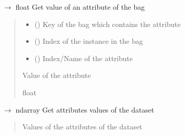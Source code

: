 \documentclass[letterpaper,10pt,english]{sphinxmanual}
\begin{document}
\begin{fulllineitems}
\begin{fulllineitems}
\label{\detokenize{data/_autosummary/miml.data.miml_dataset.MIMLDataset:miml.data.miml_dataset.MIMLDataset.get_attribute}}
\pysigstartsignatures
\pysiglinewithargsret
{}
{\sphinxparamcomma {}\sphinxparamcomma {}}
{{ $\rightarrow$ float}}
\pysigstopsignatures
\sphinxAtStartPar
Get value of an attribute of the bag
\begin{quote}\begin{description}
\begin{itemize}
\item {} 
\sphinxAtStartPar
{} () \textendash{} Key of the bag which contains the attribute

\item {} 
\sphinxAtStartPar
{} () \textendash{} Index of the instance in the bag

\item {} 
\sphinxAtStartPar
{} () \textendash{} Index/Name of the attribute

\end{itemize}

\sphinxAtStartPar
{} \textendash{} Value of the attribute

\sphinxAtStartPar
float

\end{description}\end{quote}

\end{fulllineitems}


\begin{fulllineitems}
\label{\detokenize{data/_autosummary/miml.data.miml_dataset.MIMLDataset:miml.data.miml_dataset.MIMLDataset.get_attributes}}
\pysigstartsignatures
\pysiglinewithargsret
{}
{}
{{ $\rightarrow$ ndarray}}
\pysigstopsignatures
\sphinxAtStartPar
Get attributes values of the dataset
\begin{quote}\begin{description}
\sphinxAtStartPar
{} \textendash{} Values of the attributes of the dataset


\end{description}
\end{quote}
\end{fulllineitems}
\end{fulllineitems}
\end{document}

